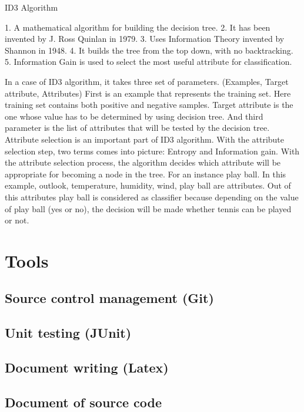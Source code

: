 \documentclass{article}
\begin{document}
ID3 Algorithm

1. A mathematical algorithm for building the decision tree.
2. It has been invented by J. Ross Quinlan in 1979.
3. Uses Information Theory invented by Shannon in 1948.
4. It builds the tree from the top down, with no backtracking.
5. Information Gain is used to select the most useful attribute for classification.

In a case of ID3 algorithm, it takes three set of parameters.
(Examples, Target attribute, Attributes)
First is an example that represents the training set. Here training set contains both positive and negative samples. Target attribute is the one whose value has to be determined by using decision tree. And third parameter is the list of attributes that will be tested by the decision tree. Attribute selection is an important part of ID3 algorithm. With the attribute selection step, two terms comes into picture: Entropy and Information gain. With the attribute selection process, the algorithm decides which attribute will be appropriate for becoming a node in the tree. 
For an instance play ball. In this example, outlook, temperature, humidity, wind, play ball are attributes. Out of this attributes play ball is considered as classifier because depending on the value of play ball (yes or no), the decision will be made whether tennis can be played or not.    



\section{Tools}
\label{sec:Tools}

\subsection{Source control management (Git)}
\label{sec:scm}

\subsection{Unit testing (JUnit)}
\label{sec:junit}

\subsection{Document writing (Latex)}
\label{sec:latex}

\subsection{Document of source code}
\label{sec:documentsource}
\end{document}
